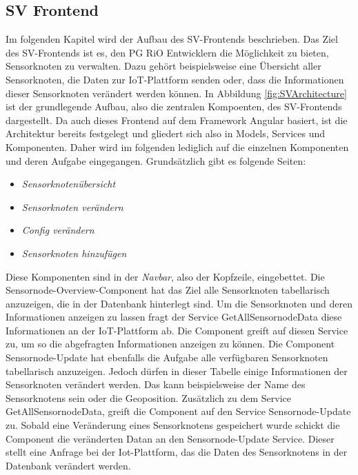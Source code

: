 \subsection{SV Frontend}
Im folgenden Kapitel wird der Aufbau des SV-Frontends beschrieben. Das Ziel des SV-Frontends ist es, den PG RiO Entwicklern die Möglichkeit zu bieten, Sensorknoten zu verwalten. Dazu gehört beispielsweise eine Übersicht aller Sensorknoten, die Daten zur IoT-Plattform senden oder, dass die Informationen dieser Sensorknoten verändert werden können. In Abbildung \ref{fig:SVArchitecture} ist der grundlegende Aufbau, also die zentralen Kompoenten, des SV-Frontends dargestellt. \newline
Da auch dieses Frontend auf dem Framework Angular basiert, ist die Architektur bereits festgelegt und gliedert sich also in Models, Services und Komponenten. Daher wird im folgenden lediglich auf die einzelnen Komponenten und deren Aufgabe eingegangen. Grundsätzlich gibt es folgende Seiten:
\begin{itemize}
	\item  \textit{Sensorknotenübersicht}
	\item \textit{Sensorknoten verändern}
	\item \textit{Config verändern} 
	\item \textit{Sensorknoten hinzufügen}
\end{itemize}
Diese Komponenten sind in der \textit{Navbar}, also der Kopfzeile, eingebettet. \newline
Die Sensornode-Overview-Component hat das Ziel alle Sensorknoten tabellarisch anzuzeigen, die in der Datenbank hinterlegt sind. Um die Sensorknoten und deren Informationen anzeigen zu lassen fragt der Service GetAllSensornodeData diese Informationen an der IoT-Plattform ab. Die Component greift auf diesen Service zu, um so die abgefragten Informationen anzeigen zu können. \newline
Die Component Sensornode-Update hat ebenfalls die Aufgabe alle verfügbaren Sensorknoten tabellarisch anzuzeigen. Jedoch dürfen in dieser Tabelle einige Informationen der Sensorknoten verändert werden. Das kann beispielsweise der Name des Sensorknotens sein oder die Geoposition. Zusätzlich zu dem Service GetAllSensornodeData, greift die Component auf den Service Sensornode-Update zu. Sobald eine Veränderung eines Sensorknotens gespeichert wurde schickt die Component die veränderten Datan an den Sensornode-Update Service. Dieser stellt eine Anfrage bei der Iot-Plattform, das die Daten des Sensorknotens in der Datenbank verändert werden. \newline

